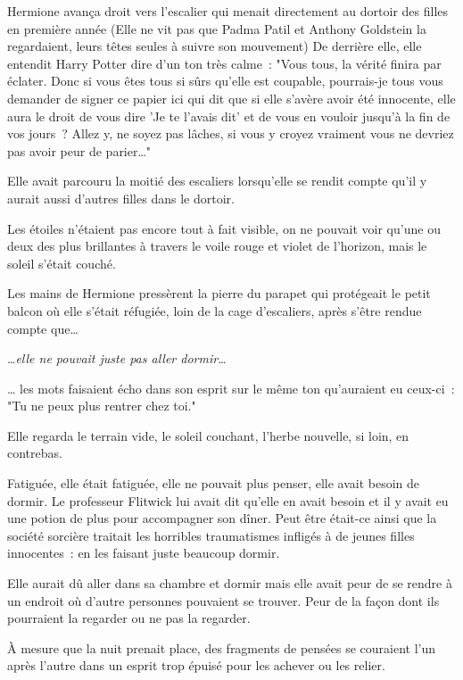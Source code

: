 Hermione avança droit vers l'escalier qui menait directement au dortoir des filles en première année (Elle ne vit pas que Padma Patil et Anthony Goldstein la regardaient, leurs têtes seules à suivre son mouvement) De derrière elle, elle entendit Harry Potter dire d'un ton très calme~: "Vous tous, la vérité finira par éclater. Donc si vous êtes tous si sûrs qu'elle est coupable, pourrais-je tous vous demander de signer ce papier ici qui dit que si elle s'avère avoir été innocente, elle aura le droit de vous dire 'Je te l'avais dit' et de vous en vouloir jusqu'à la fin de vos jours~? Allez y, ne soyez pas lâches, si vous y croyez vraiment vous ne devriez pas avoir peur de parier…"

Elle avait parcouru la moitié des escaliers lorsqu'elle se rendit compte qu'il y aurait aussi d'autres filles dans le dortoir.

\later

Les étoiles n'étaient pas encore tout à fait visible, on ne pouvait voir qu'une ou deux des plus brillantes à travers le voile rouge et violet de l'horizon, mais le soleil s'était couché.

Les mains de Hermione pressèrent la pierre du parapet qui protégeait le petit balcon où elle s'était réfugiée, loin de la cage d'escaliers, après s'être rendue compte que…

…\emph{elle ne pouvait juste pas aller dormir…}

… les mots faisaient écho dans son esprit sur le même ton qu'auraient eu ceux-ci~: "Tu ne peux plus rentrer chez toi."

Elle regarda le terrain vide, le soleil couchant, l'herbe nouvelle, si loin, en contrebas.

Fatiguée, elle était fatiguée, elle ne pouvait plus penser, elle avait besoin de dormir. Le professeur Flitwick lui avait dit qu'elle en avait besoin et il y avait eu une potion de plus pour accompagner son dîner. Peut être était-ce ainsi que la société sorcière traitait les horribles traumatismes infligés à de jeunes filles innocentes~: en les faisant juste beaucoup dormir.

Elle aurait dû aller dans sa chambre et dormir mais elle avait peur de se rendre à un endroit où d'autre personnes pouvaient se trouver. Peur de la façon dont ils pourraient la regarder ou ne pas la regarder.

À mesure que la nuit prenait place, des fragments de pensées se couraient l'un après l'autre dans un esprit trop épuisé pour les achever ou les relier.

